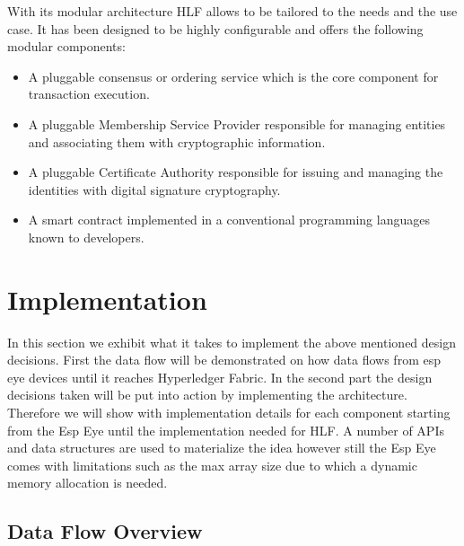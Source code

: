 With its modular architecture HLF allows to be tailored to the needs and the use case. It has been designed to be highly configurable and offers the following modular components: 

\begin{itemize}
    \item A pluggable consensus or ordering service which is the core component for transaction execution.
    \item A pluggable Membership Service Provider responsible for managing entities and associating them with cryptographic information.
    \item A pluggable Certificate Authority responsible for issuing and managing the identities with digital signature cryptography.
     \item A smart contract implemented in a conventional programming languages known to developers. 
    
\end{itemize}



\section{Implementation}

In this section we exhibit what it takes to implement the above mentioned design decisions. First the data flow will be demonstrated on how data flows from esp eye devices until it reaches Hyperledger Fabric. 
In the second part the design decisions taken will be put into action by implementing the architecture. Therefore we will show with implementation details for each component starting from the Esp Eye until the implementation needed for HLF. A number of APIs and data structures are used to materialize the idea however still the Esp Eye comes with limitations such as the max array size due to which a dynamic memory allocation is needed.  





\subsection{Data Flow Overview}

